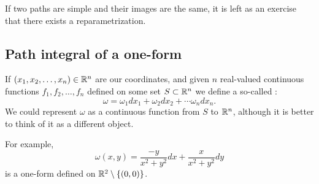 
If two paths are simple and their images are the same, it is
left as an exercise that there exists a reparametrization.

\subsection{Path integral of a one-form}

\begin{defn}
If $(x_1,x_2,\ldots,x_n) \in {\mathbb{R}}^n$ are our coordinates, and
given $n$ real-valued continuous functions $f_1,f_2,\ldots,f_n$ defined on some set $S \subset {\mathbb{R}}^n$ we
define a so-called \emph{}:
\begin{equation*}
\omega = \omega_1 dx_1 + \omega_2 dx_2 + \cdots \omega_n dx_n .
\end{equation*}
We could represent $\omega$ as a continuous function from $S$ to ${\mathbb{R}}^n$, although it is
better to think of it as a different object.
\end{defn}

\begin{example}
For example,
\begin{equation*}
\omega(x,y) = \frac{-y}{x^2+y^2} dx + \frac{x}{x^2+y^2} dy
\end{equation*}
is a one-form defined on ${\mathbb{R}}^2 \setminus \{ (0,0) \}$.
\end{example}

